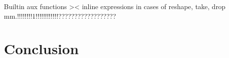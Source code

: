 \documentclass[11pt]{article}
\begin{document}
Builtin aux functions >< inline expressions in cases of reshape, take, drop mm.!!!!!!!!1!!!!!!!!!!!!??????????????????

\section{Conclusion}



\end{document}
